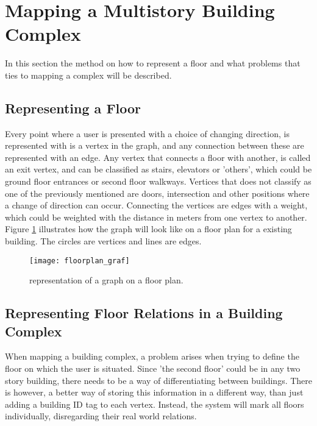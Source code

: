 
\section{Mapping a Multistory Building Complex}

In this section the method on how to represent a floor and what problems that ties to mapping a complex will be described.

\subsection{Representing a Floor}

Every point where a user is presented with a choice of changing direction, is represented with is a vertex in the graph, and any connection between these are represented with an edge. \label{e_vertex} Any vertex that connects a floor with another, is called an exit vertex, and can be classified as stairs, elevators or 'others', which could be ground floor entrances or second floor walkways. Vertices that does not classify as one of the previously mentioned are doors, intersection and other positions where a change of direction can occur. Connecting the vertices are edges with a weight, which could be weighted with the distance in meters from one vertex to another. Figure \ref{fig:floorplan_graf} illustrates how the graph will look like on a floor plan for a existing building. The circles are vertices and lines are edges.


\begin{figure}[ht!]
    \centering
    \texttt{[image: floorplan\_graf]}
    \caption{representation of a graph on a floor plan.}
    \label{fig:floorplan_graf}
  \end{figure}

\subsection{Representing Floor Relations in a Building Complex}

When mapping a building complex, a problem arises when trying to define the floor on which the user is situated. Since 'the second floor' could be in any two story building, there needs to be a way of differentiating between buildings. There is however, a better way of storing this information in a different way, than just adding a building ID tag to each vertex. Instead, the system will mark all floors individually, disregarding their real world relations.

